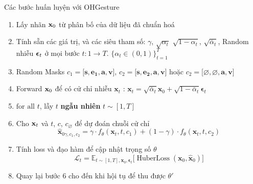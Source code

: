 \begin{frame}{Các bước huấn luyện với OHGesture}
	\begin{enumerate}
		\item Lấy nhãn $\mathbf{x}_0$ từ phân bố của dữ liệu đã chuẩn hoá
		\item Tính sẵn các giá trị, và các siêu tham số: $\gamma$, $\sqrt{\alpha_t}$ $\sqrt{1 - \alpha_t}$, $\sqrt{\bar{\alpha}_t}$, Random nhiễu ${\boldsymbol{\epsilon}}_t$ ở mọi bước $t: 1 \rightarrow T$.
		$\{\alpha_t \in (0, 1)\}_{t=1}^T$
		\item Random Masks  $c_{1} = \big[ \mathbf{s} , \mathbf{e_1}, \mathbf{a}, \mathbf{v} \big]$, $c_{2} = \big[ \mathbf{s} , \mathbf{e_2}, \mathbf{a}, \mathbf{v}\big]$ hoặc $c_{2} = \big[ \varnothing , \varnothing, \mathbf{a},  \mathbf{v} \big]$
		\item Forward $\mathbf{x}_0$ để có cử chỉ nhiễu $\mathbf{x}_t$ :  $\mathbf{x}_t = \sqrt{\bar{\alpha}_t}\mathbf{x}_0 + \sqrt{1 - \bar{\alpha}_t}\boldsymbol{\epsilon}_t$
		\item $\text{for all}$ $t$, lẫy $t$ \textbf{ngẫu nhiên} $t \sim [1, T]$
		\item Cho $\mathbf{x}_t$ và $t$, $c$, $c_{\varnothing}$ để dự đoán chuỗi cử chỉ
		\begin{equation}
			\hat{\mathbf{x}}_{0 \gamma, c_{1}, c_{2}}=\gamma \cdot f_{\theta}  \left(\mathbf{x}_{t}, t, c_{1}\right)+(1-\gamma) \cdot f_{\theta} \left(\mathbf{x}_{t}, t, c_{2}\right)
		\end{equation}
		\item Tính loss và đạo hàm để cập nhật trọng số $\theta$
		\begin{equation}
			\mathcal{L}_t = \mathbb{E}_{t \sim [1, T], \mathbf{x}_0, \boldsymbol{\epsilon}_t} \Big[ \operatorname{HuberLoss}(\mathbf{x}_0, \hat{\mathbf{x}}_0 ) \Big]
		\end{equation}
	
	
		\item Quay lại bước 6 cho đến khi hội tụ để thu được $\theta'$
	\end{enumerate}
\end{frame}


